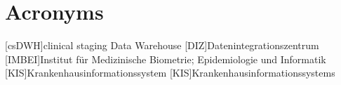 \chapter*{Acronyms}
    \begin{acronym}[CDW]
    	
    	[csDWH]{clinical staging Data Warehouse}
    	[DIZ]{Datenintegrationszentrum} 
    	[IMBEI]{Institut für Medizinische Biometrie; Epidemiologie und Informatik}
    	[KIS]{Krankenhausinformationssystem}
	[KIS]{Krankenhausinformationssystems}
    \end{acronym}
